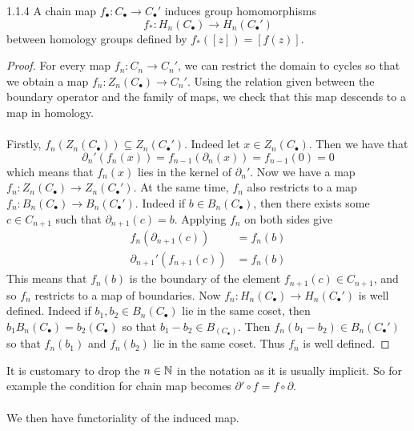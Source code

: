 \documentclass[a4paper]{article}
\begin{document}
\begin{lmm}{}{1.1.4} A chain map $f_\bullet:C_\bullet\to C_\bullet'$ induces group homomorphisms $$f_\ast:H_n(C_\bullet)\to H_n(C_\bullet')$$ between homology groups defined by $f_\ast([z])=[f(z)]$. \tcbline
\begin{proof}
For every map $f_n:C_n\to C_n'$, we can restrict the domain to cycles so that we obtain a map $f_n:Z_n(C_\bullet)\to C_n'$. Using the relation given between the boundary operator and the family of maps, we check that this map descends to a map in homology. \\~\\

Firstly, $f_n(Z_n(C_\bullet))\subseteq Z_n(C_\bullet')$. Indeed let $x\in Z_n(C_\bullet)$. Then we have that $$\partial_n'(f_n(x))=f_{n-1}(\partial_n(x))=f_{n-1}(0)=0$$ which means that $f_n(x)$ lies in the kernel of $\partial_n'$. Now we have a map $f_n:Z_n(C_\bullet)\to Z_n(C_\bullet')$. At the same time, $f_n$ also restricts to a map $f_n:B_n(C_\bullet)\to B_n(C_\bullet')$. Indeed if $b\in B_n(C_\bullet)$, then there exists some $c\in C_{n+1}$ such that $\partial_{n+1}(c)=b$. Applying $f_n$ on both sides give 
\begin{align*}
f_n(\partial_{n+1}(c))&=f_n(b)\\
\partial_{n+1}'(f_{n+1}(c))&=f_n(b)
\end{align*}
This means that $f_n(b)$ is the boundary of the element $f_{n+1}(c)\in C_{n+1}$, and so $f_n$ restricts to a map of boundaries. Now $f_n:H_n(C_\bullet)\to H_n(C_\bullet')$ is well defined. Indeed if $b_1,b_2\in B_n(C_\bullet)$ lie in the same coset, then $b_1B_n(C_\bullet)=b_2(C_\bullet)$ so that $b_1-b_2\in B_(C_\bullet)$. Then $f_n(b_1-b_2)\in B_n(C_\bullet')$ so that $f_n(b_1)$ and $f_n(b_2)$ lie in the same coset. Thus $f_n$ is well defined. 
\end{proof}
\end{lmm}

It is customary to drop the $n\in\mathbb{N}$ in the notation as it is usually implicit. So for example the condition for chain map becomes $\partial'\circ f=f\circ\partial$. \\~\\

We then have functoriality of the induced map. 
\end{document}
